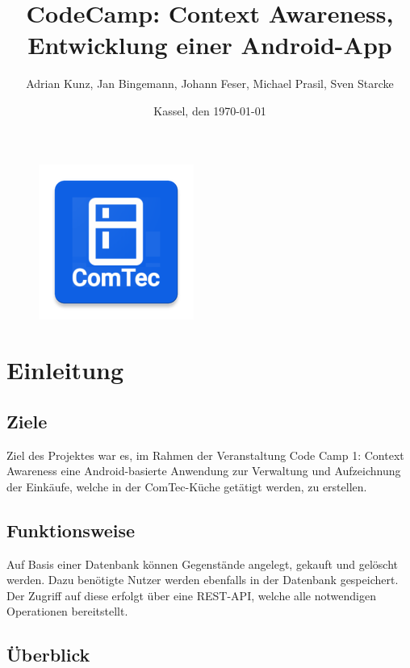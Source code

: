 \documentclass{scrartcl}
\title{CodeCamp: Context Awareness, Entwicklung einer Android-App}
\author{Adrian Kunz, Jan Bingemann, Johann Feser, Michael Prasil, Sven Starcke}
\date{Kassel, den \today}
\begin{document}
	\maketitle
	\vspace*{10ex}
	\begin{figure}[!h]
		\centering
		\includegraphics{figures/title.png}
	\end{figure}

	\newpage

	\tableofcontents
	\newpage

	\section{Einleitung}\label{sec:einleitung}

	\subsection{Ziele}\label{subsec:ziele}

	Ziel des Projektes war es, im Rahmen der Veranstaltung \glqq Code Camp 1: Context Awareness\grqq{} eine Android-basierte Anwendung zur Verwaltung und Aufzeichnung der Einkäufe, welche in der ComTec-Küche getätigt werden, zu erstellen.

	\subsection{Funktionsweise}\label{subsec:funktionsweise}

	Auf Basis einer Datenbank können Gegenstände angelegt, gekauft und gelöscht werden.
	Dazu benötigte Nutzer werden ebenfalls in der Datenbank gespeichert.
	Der Zugriff auf diese erfolgt über eine REST-API, welche alle notwendigen Operationen bereitstellt.

	\subsection{Überblick}\label{subsec:überblick}
\end{document}
